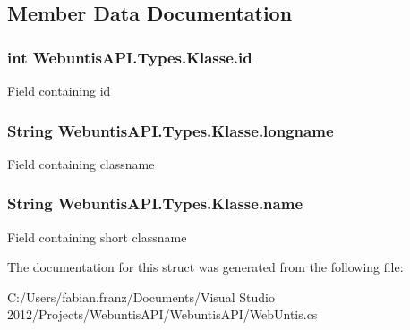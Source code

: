 \subsection{Member Data Documentation}
\hypertarget{struct_webuntis_a_p_i_1_1_types_1_1_klasse_a0c8d6c1ce71142b67d20df2c818bbc75}{
\subsubsection[{id}]{\setlength{\rightskip}{0pt plus 5cm}int Webuntis\-A\-P\-I.\-Types.\-Klasse.\-id}}\label{struct_webuntis_a_p_i_1_1_types_1_1_klasse_a0c8d6c1ce71142b67d20df2c818bbc75}
Field containing id \hypertarget{struct_webuntis_a_p_i_1_1_types_1_1_klasse_a0ec00ea38031e97b255fa139387142e7}{
\subsubsection[{longname}]{\setlength{\rightskip}{0pt plus 5cm}String Webuntis\-A\-P\-I.\-Types.\-Klasse.\-longname}}\label{struct_webuntis_a_p_i_1_1_types_1_1_klasse_a0ec00ea38031e97b255fa139387142e7}
Field containing classname \hypertarget{struct_webuntis_a_p_i_1_1_types_1_1_klasse_a034b759d9d7262da6eaa0613d5f6a0e7}{
\subsubsection[{name}]{\setlength{\rightskip}{0pt plus 5cm}String Webuntis\-A\-P\-I.\-Types.\-Klasse.\-name}}\label{struct_webuntis_a_p_i_1_1_types_1_1_klasse_a034b759d9d7262da6eaa0613d5f6a0e7}
Field containing short classname 

The documentation for this struct was generated from the following file\-:\begin{DoxyCompactItemize}
\item 
C\-:/\-Users/fabian.\-franz/\-Documents/\-Visual Studio 2012/\-Projects/\-Webuntis\-A\-P\-I/\-Webuntis\-A\-P\-I/Web\-Untis.\-cs\end{DoxyCompactItemize}
